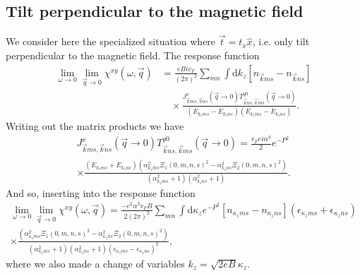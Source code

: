 \subsection{Tilt perpendicular to the magnetic field}
\label{sec:perptiltsum}
We consider here the specialized situation where \( \vec{t} = t_x \hat{x} \), i.e. only tilt perpendicular to the magnetic field.
The response function
\begin{equation}
  \begin{split}
  \lim_{\omega \to 0} \lim_{\vec{q} \to 0} \chi^{xy}(\omega, \vec{q}) &=
  \frac{e B i v_F}{(2 \pi)^2}
  \sum\limits_{mn}^{} \int \mathrm{d}k_z [n_{\vec{k} m s} - n_{\vec{k} n s}]\\
  &\quad \times \frac{
    J^x_{\vec{k} m s, \vec{k} ns} (\vec{q}\to 0) T^{y 0}_{\vec{k} n s, \vec{k}ms}(\vec{q} \to 0)
  }{
    (E_{k_z m s} - E_{k_z ns})(E_{k_z m s}-E_{k_z ns})
  }.
  \end{split}
\end{equation}
Writing out the matrix products we have
\begin{equation}
  \begin{multlined}
    J^x_{\vec{k} m s, \vec{k} ns} (\vec{q} \to 0) T^{y 0}_{\vec{k} n s, \vec{k}ms}(\vec{q} \to 0)
    =
    \frac{v_F e i \alpha^{3}}{2}
    e^{-P^2}\\
    \times \frac{
      (E_{k_{z} m s} + E_{k_z n s})
      (\alpha_{k_z m s}^2 \Xi_1(0, m,n, s)^2 - \alpha_{k_z n s}^2 \Xi_2(0, m,n, s)^2)
    }{
      (\alpha_{k_z m s}^2 + 1)(\alpha_{k_z n s}^2 + 1)
    }.
  \end{multlined}
  \label{eq:114}
\end{equation}
And so, inserting into the response function
{\setlength{\multlinegap}{0pt}%
\begin{multline}
  \label{eq:115}
    \lim_{\omega \to 0} \lim_{\vec{q} \to 0} \chi^{xy}(\omega, \vec{q}) =
    \frac{- e^2 \alpha^3 v_F B }{2 (2 \pi)^2 }
    \sum\limits_{mn}^{}
    \int \mathrm{d}\kappa_z
    e^{-P^2}
      [n_{\kappa_z m s} - n_{\kappa_z n s}]
      (\epsilon_{\kappa_z m s} + \epsilon_{\kappa_z n s})\\
    \times\frac{
      (\alpha_{\kappa_z m s}^2 \Xi_1(0, m,n, s)^2 - \alpha_{\kappa_z n s}^2 \Xi_2(0, m,n, s)^2)
    }{
      (\alpha_{\kappa_z m s}^2 + 1)(\alpha_{\kappa_z n s}^2 + 1)
      (\epsilon_{\kappa_z m s} - \epsilon_{\kappa_z ns})^2
    },
\end{multline}}
where we also made a change of variables \( k_z = \sqrt{2 e B} \kappa_z \).

